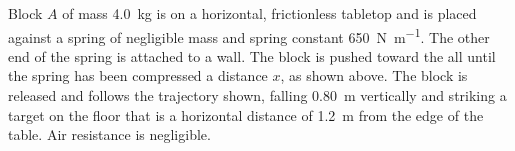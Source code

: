 \documentclass[12pt]{exam}
\newcommand{\pic}[2]{
  \begin{center}
    \texttt{[image: \#2]}
  \end{center}
}
\begin{document}
\begin{questions}
%
%    
%    
%    
%
%

  \uplevel{
    \pic{.66}{energy}
  }
  \question[15] Block $A$ of mass \SI{4.0}{\kilo\gram} is on a horizontal,
  frictionless tabletop and is placed against a spring of negligible mass and
  spring constant \SI{650}{\newton\per\metre}. The other end of the spring is
  attached to a wall. The block is pushed toward the all until the spring has
  been compressed a distance $x$, as shown above. The block is released and
  follows the trajectory shown, falling \SI{.80}{\metre} vertically and
  striking a target on the floor that is a horizontal distance of
  \SI{1.2}{\metre} from the edge of the table. Air resistance is negligible.
  \begin{parts}

\end{parts}
\end{questions}
\end{document}
